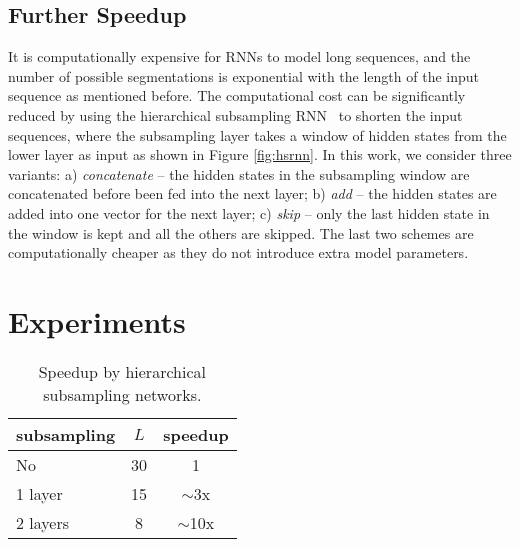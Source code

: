 \documentclass[a4paper]{article}
\begin{document}
\subsection{Further Speedup}
\label{sec:subsample}

It is computationally expensive for RNNs to model long sequences, and the number of possible segmentations is exponential with the length of the input sequence as mentioned before. The computational cost can be significantly reduced by using the hierarchical subsampling RNN~\cite{graves2012hierarchical} to shorten the input sequences, where the subsampling layer takes a window of hidden states from the lower layer as input as shown in Figure \ref{fig:hsrnn}.  In this work, we consider three variants: a) {\it concatenate} -- the hidden states in the subsampling window are concatenated before been fed into the next layer; b) {\it add} -- the hidden states are added into one vector for the next layer; c) {\it skip} -- only the last hidden state in the window is kept and all the others are skipped. The last two schemes are computationally cheaper as they do not introduce extra model parameters. 

\section{Experiments}
\label{sec:exp}


 \begin{table}
 \centering \small
\caption{Speedup by hierarchical subsampling networks. }\vskip 1.5mm

\label{tab:speedup}
\begin{tabular}{l|cc}
\hline

\hline
subsampling   & $L$ &  speedup  \\ \hline
No & 30  & 1 \\
1 layer & 15   & $\sim$3x\\
2 layers & 8 & $\sim$10x \\

\hline

\hline
\end{tabular}
\vskip-4mm
\end{table}
\end{document}
